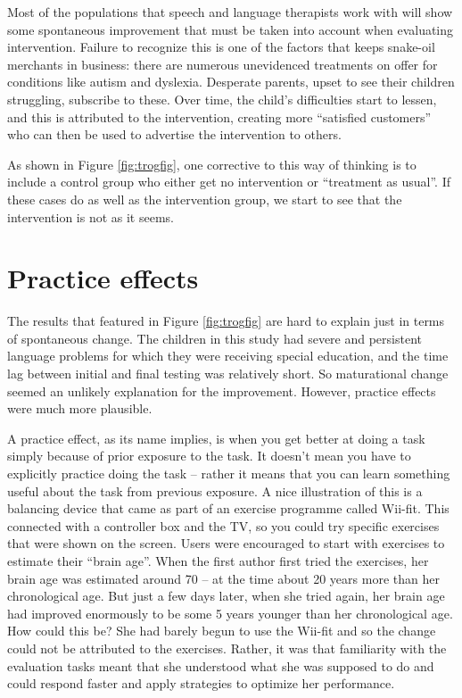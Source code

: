 \documentclass{krantz}
\begin{document}
Most of the populations that speech and language therapists work with will show some spontaneous improvement that must be taken into account when evaluating intervention. Failure to recognize this is one of the factors that keeps snake-oil merchants in business: there are numerous unevidenced treatments on offer for conditions like autism and dyslexia. Desperate parents, upset to see their children struggling, subscribe to these. Over time, the child's difficulties start to lessen, and this is attributed to the intervention, creating more ``satisfied customers'' who can then be used to advertise the intervention to others.

As shown in Figure \ref{fig:trogfig}, one corrective to this way of thinking is to include a control group who either get no intervention or ``treatment as usual''. If these cases do as well as the intervention group, we start to see that the intervention is not as it seems.

\hypertarget{practice-effects-1}{%
\section{Practice effects}\label{practice-effects-1}}

The results that featured in Figure \ref{fig:trogfig} are hard to explain just in terms of spontaneous change. The children in this study had severe and persistent language problems for which they were receiving special education, and the time lag between initial and final testing was relatively short. So maturational change seemed an unlikely explanation for the improvement. However, practice effects were much more plausible.

A practice effect, as its name implies, is when you get better at doing a task simply because of prior exposure to the task. It doesn't mean you have to explicitly practice doing the task -- rather it means that you can learn something useful about the task from previous exposure. A nice illustration of this is a balancing device that came as part of an exercise programme called Wii-fit. This connected with a controller box and the TV, so you could try specific exercises that were shown on the screen. Users were encouraged to start with exercises to estimate their ``brain age''. When the first author first tried the exercises, her brain age was estimated around 70 -- at the time about 20 years more than her chronological age. But just a few days later, when she tried again, her brain age had improved enormously to be some 5 years younger than her chronological age. How could this be? She had barely begun to use the Wii-fit and so the change could not be attributed to the exercises. Rather, it was that familiarity with the evaluation tasks meant that she understood what she was supposed to do and could respond faster and apply strategies to optimize her performance.
\end{document}
